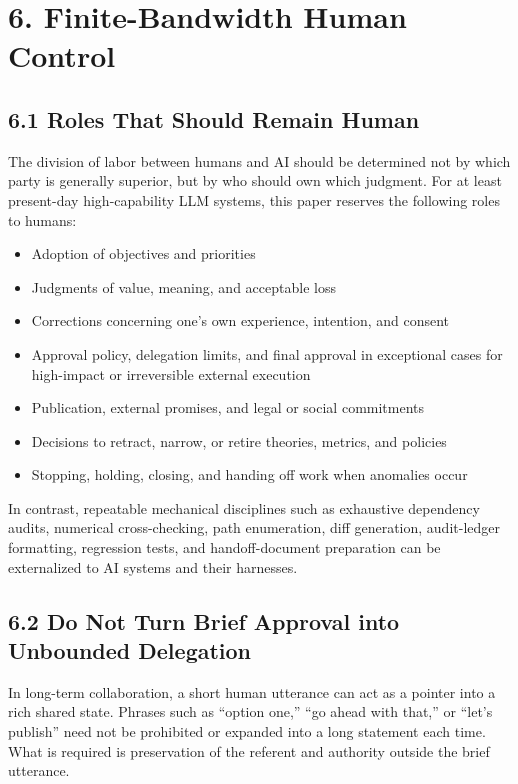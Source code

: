 \section{6. Finite-Bandwidth Human Control}\label{finite-bandwidth-human-control}

\subsection{6.1 Roles That Should Remain Human}\label{roles-that-should-remain-human}

The division of labor between humans and AI should be determined not by which party is generally superior, but by who should own which judgment. For at least present-day high-capability LLM systems, this paper reserves the following roles to humans:

\begin{itemize}
\tightlist
\item
  Adoption of objectives and priorities
\item
  Judgments of value, meaning, and acceptable loss
\item
  Corrections concerning one's own experience, intention, and consent
\item
  Approval policy, delegation limits, and final approval in exceptional cases for high-impact or irreversible external execution
\item
  Publication, external promises, and legal or social commitments
\item
  Decisions to retract, narrow, or retire theories, metrics, and policies
\item
  Stopping, holding, closing, and handing off work when anomalies occur
\end{itemize}

In contrast, repeatable mechanical disciplines such as exhaustive dependency audits, numerical cross-checking, path enumeration, diff generation, audit-ledger formatting, regression tests, and handoff-document preparation can be externalized to AI systems and their harnesses.

\subsection{6.2 Do Not Turn Brief Approval into Unbounded Delegation}\label{do-not-turn-brief-approval-into-unbounded-delegation}

In long-term collaboration, a short human utterance can act as a pointer into a rich shared state. Phrases such as ``option one,'' ``go ahead with that,'' or ``let's publish'' need not be prohibited or expanded into a long statement each time. What is required is preservation of the referent and authority outside the brief utterance.

